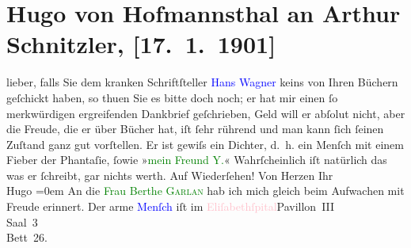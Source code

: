 

               \section[Hugo von Hofmannsthal an Arthur Schnitzler, {[}17. 1. 1901{]}]{ Hugo von Hofmannsthal an Arthur Schnitzler, {[}17. 1. 1901{]}}\nopagebreak{}\rehead{ }\normalsize\beginnumbering{} \toendnotes[C]{\smallbreak\pagebreak[2]} 
\toendnotes[C]{\smallbreak}\pstart{}{\pb}lieber,\pend\pstart
           falls Sie dem kranken Schriftſteller \textcolor{blue}{Hans Wagner}{}\ledrightnote{\textcolor{blue}{Hans Wagner}}
               keins von Ihren Büchern geſchickt haben, so thuen Sie es bitte doch noch; er hat mir
               einen ſo merkwürdigen ergreifenden Dankbrief geſchrieben, Geld will er abſolut nicht,
               aber die Freude, die er über Bücher hat, {\pb}iſt ſehr rührend und man kann ſich
               ſeinen Zuſtand ganz gut vorſtellen.\pend
           \pstart
           Er ist gewiſs ein Dichter, d. h. ein Menſch mit einem Fieber der Phantaſie, ſowie
                  »\textcolor{green}{mein Freund Y.}{}\ledrightnote{\textcolor{green}{Mein Freund Ypsilon}}«\pend
           \pstart
           Wahrſcheinlich iſt natürlich das was er ſchreibt, gar nichts werth. Auf
               Wiederſehen!\pend
           \pstart
           {\pb}Von Herzen Ihr{\\[\baselineskip]}\spacefill\mbox{Hugo}\pend
           \leftskip=0em{}\pstart
           \noindent{}An die \textcolor{green}{Frau Berthe{ }\textsc{Garlan}}{}\ledrightnote{\textcolor{green}{Frau Bertha Garlan. Roman}} hab ich mich gleich beim Aufwachen mit Freude erinnert.\pend
           \pstart
           Der arme \textcolor{blue}{Menſch}{} iſt im \textcolor{pink}{Eliſabethſpital}{}\ledrightnote{\textcolor{pink}{Kaiserin-Elisabeth-Spital}}{\\}Pavillon III{\\}Saal 3{\\}Bett 26.\pend
           \endnumbering{}  
      